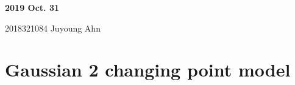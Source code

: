 \documentclass[11pt]{article}
\begin{document}
	
	
	
	\newcommand{\Ito}{$It\hat{o}$'$s~Lemma$}
	
	\newcommand\ind{\stackrel{\rm ind}{\sim}}
	\newcommand\iid{\stackrel{\rm iid}{\sim}}
	\renewcommand\c{\mathbf{c}}
	\newcommand\y{\mathbf{y}}
	\newcommand\z{\mathbf{z}}
	\renewcommand\P{\mathbf{P}}
	\newcommand\W{\mathbf{W}}
	\newcommand\X{\mathbf{X}}
	\newcommand\Y{\mathbf{Y}}
	\newcommand\Z{\mathbf{Z}}
	\newcommand\J{{\cal J}}
	\newcommand\B{{\cal B}}
	\newcommand\K{{\cal K}}
	\newcommand\N{{\rm N}}
	\newcommand\bs{\boldsymbol}
	\newcommand\bth{\bs\theta}
	\newcommand\bbe{\bs\beta}
	\renewcommand\*{^\star}
	\newcommand{\notimplies}{%
		\mathrel{{\ooalign{\hidewidth$\not\phantom{=}$\hidewidth\cr$\implies$}}}}
	
	\def\spacingset#1{\renewcommand{\baselinestretch}%
		{#1}\small\normalsize} \spacingset{1}
	
	
	
	\bigskip
	\bigskip
	\bigskip
	\begin{center}
		{\LARGE\bf 2019 Oct. 31 }
	\end{center}
	\begin{center}
		2018321084 Juyoung Ahn
	\end{center}
	\medskip
	
	
	
	\spacingset{1.45}
	\section{Gaussian 2 changing point model}
\end{document}
